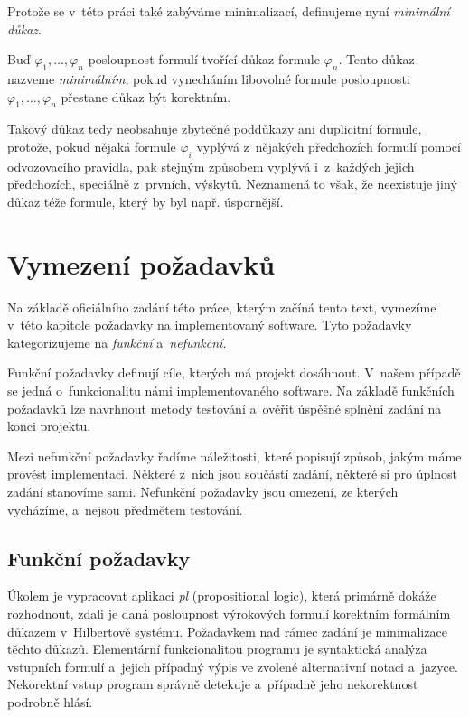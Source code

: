 \documentclass[thesis=B,czech,hidelinks]{thesis}[2012/06/26]
\begin{document}
Protože se v~této práci také zabýváme minimalizací, definujeme nyní \emph{minimální důkaz}.

\begin{dfn}
\label{dfn:minimal_proof}
Buď $\varphi_1, \ldots, \varphi_n$ posloupnost formulí tvořící důkaz formule $\varphi_n$. Tento důkaz nazveme \emph{minimálním}, pokud vynecháním libovolné formule posloupnosti $\varphi_1, \ldots, \varphi_n$ přestane důkaz být korektním.
\end{dfn}

Takový důkaz tedy neobsahuje zbytečné poddůkazy ani duplicitní formule, protože, pokud nějaká formule $\varphi_i$ vyplývá z~nějakých předchozích formulí pomocí odvozovacího pravidla, pak stejným způsobem vyplývá i~z~každých jejich předchozích, speciálně z~prvních, výskytů. Neznamená to však, že neexistuje jiný důkaz téže formule, který by byl např. úspornější.

%
%
%

\chapter{Vymezení požadavků}

Na základě oficiálního zadání této práce, kterým začíná tento text, vymezíme v~této kapitole požadavky na implementovaný software. Tyto požadavky kategorizujeme na \emph{funkční} a~\emph{nefunkční}.

Funkční požadavky definují cíle, kterých má projekt dosáhnout. V~našem případě se jedná o~funkcionalitu námi implementovaného software. Na základě funkčních požadavků lze navrhnout metody testování a~ověřit úspěšné splnění zadání na konci projektu.

Mezi nefunkční požadavky řadíme náležitosti, které popisují způsob, jakým máme provést implementaci. Některé z~nich jsou součástí zadání, některé si pro úplnost zadání stanovíme sami. Nefunkční požadavky jsou omezení, ze kterých vycházíme, a~nejsou předmětem testování.

\section{Funkční požadavky}

Úkolem je vypracovat aplikaci \emph{pl} (propositional logic), která primárně dokáže rozhodnout, zdali je daná posloupnost výrokových formulí korektním formálním důkazem v~Hilbertově systému. Požadavkem nad rámec zadání je minimalizace těchto důkazů. Elementární funkcionalitou programu je syntaktická analýza vstupních formulí a~jejich případný výpis ve zvolené alternativní notaci a~jazyce. Nekorektní vstup program správně detekuje a~případně jeho nekorektnost podrobně hlásí.
\end{document}

